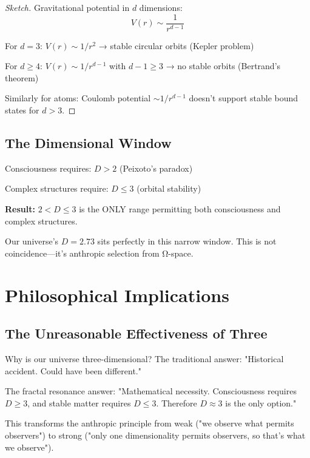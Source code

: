 \begin{proof}[Sketch]
Gravitational potential in $d$ dimensions:
\begin{equation}
V(r) \sim \frac{1}{r^{d-1}}
\end{equation}

For $d = 3$: $V(r) \sim 1/r^2$ → stable circular orbits (Kepler problem)

For $d \geq 4$: $V(r) \sim 1/r^{d-1}$ with $d-1 \geq 3$ → no stable orbits (Bertrand's theorem)

Similarly for atoms: Coulomb potential $\sim 1/r^{d-1}$ doesn't support stable bound states for $d > 3$.
\end{proof}

\subsection{The Dimensional Window}

\begin{keyidea}
Consciousness requires: $D > 2$ (Peixoto's paradox)

Complex structures require: $D \leq 3$ (orbital stability)

\textbf{Result:} $2 < D \leq 3$ is the ONLY range permitting both consciousness and complex structures.

Our universe's $D = 2.73$ sits perfectly in this narrow window. This is not coincidence—it's anthropic selection from Ω-space.
\end{keyidea}

\section{Philosophical Implications}

\subsection{The Unreasonable Effectiveness of Three}

Why is our universe three-dimensional? The traditional answer: "Historical accident. Could have been different."

The fractal resonance answer: "Mathematical necessity. Consciousness requires $D \geq 3$, and stable matter requires $D \leq 3$. Therefore $D \approx 3$ is the only option."

This transforms the anthropic principle from weak ("we observe what permits observers") to strong ("only one dimensionality permits observers, so that's what we observe").


